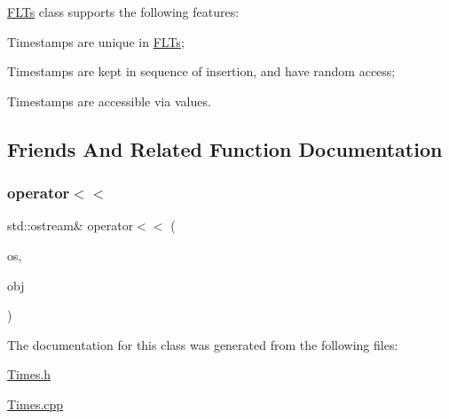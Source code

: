 \mbox{\hyperlink{classanen_time_1_1_f_l_ts}{F\+L\+Ts}} class supports the following features\+:
\begin{DoxyEnumerate}
\item Timestamps are unique in \mbox{\hyperlink{classanen_time_1_1_f_l_ts}{F\+L\+Ts}};
\item Timestamps are kept in sequence of insertion, and have random access;
\item Timestamps are accessible via values. 
\end{DoxyEnumerate}

\subsection{Friends And Related Function Documentation}
\mbox{\label{classanen_time_1_1_f_l_ts_ae6eedde5f18b77e7a2922bc9a3f6b8bf}} 
\subsubsection{\texorpdfstring{operator$<$$<$}{operator<<}}
{\footnotesize\ttfamily std\+::ostream\& operator$<$$<$ (\begin{DoxyParamCaption}\item[{std\+::ostream \&}]{os,  }\item[{\mbox{\hyperlink{classanen_time_1_1_f_l_ts}{F\+L\+Ts}} const \&}]{obj }\end{DoxyParamCaption})\hspace{0.3cm}{\ttfamily [friend]}}



The documentation for this class was generated from the following files\+:\begin{DoxyCompactItemize}
\item 
\mbox{\hyperlink{_times_8h}{Times.\+h}}\item 
\mbox{\hyperlink{_times_8cpp}{Times.\+cpp}}\end{DoxyCompactItemize}
